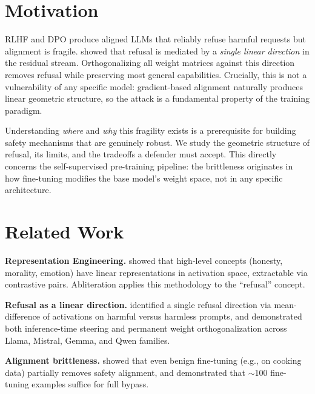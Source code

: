 \documentclass[11pt]{article}
\begin{document}

\section{Motivation}\label{motivation}

RLHF and DPO produce aligned LLMs that reliably refuse harmful requests
but alignment is fragile. \citet{arditi2024refusal} showed that refusal is
mediated by a \emph{single linear direction} in the residual stream.
Orthogonalizing all weight matrices against this direction removes
refusal while preserving most general capabilities. Crucially, this is
not a vulnerability of any specific model: gradient-based alignment
naturally produces linear geometric structure, so the attack is a
fundamental property of the training paradigm.

Understanding \emph{where} and \emph{why} this fragility exists is a prerequisite
for building safety mechanisms that are genuinely robust. We study the
geometric structure of refusal, its limits, and the tradeoffs a defender
must accept. This directly concerns the self-supervised pre-training
pipeline: the brittleness originates in how fine-tuning modifies the
base model's weight space, not in any specific architecture.

\section{Related Work}\label{related-work}

\textbf{Representation Engineering.} \citet{zou2023representation} showed that
high-level concepts (honesty, morality, emotion) have linear
representations in activation space, extractable via contrastive pairs.
Abliteration applies this methodology to the ``refusal'' concept.

\textbf{Refusal as a linear direction.} \citet{arditi2024refusal} identified a
single refusal direction via mean-difference of activations on harmful
versus harmless prompts, and demonstrated both inference-time steering
and permanent weight orthogonalization across Llama, Mistral, Gemma, and
Qwen families.

\textbf{Alignment brittleness.} \citet{yang2023finetuning} showed that even benign
fine-tuning (e.g., on cooking data) partially removes safety alignment,
and \citet{yang2023shadow} demonstrated that \(\sim\)100
fine-tuning examples suffice for full bypass.
\end{document}
